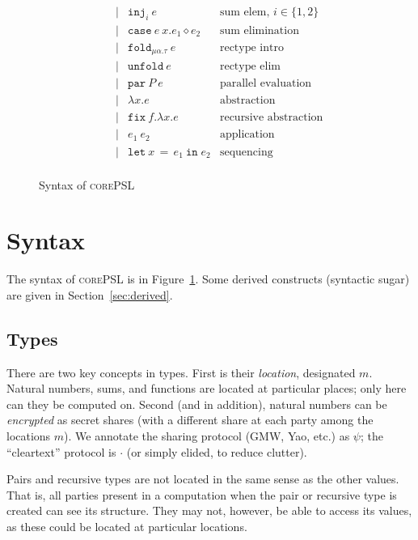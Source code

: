 \documentclass[10pt]{article}
\newcommand{\kw}[1]{\ensuremath{\mathtt{#1}}}
\newcommand{\trec}[2]{\ensuremath{\mu {#1}.{#2}}}
\newcommand{\elet}[3]{\ensuremath{\kw{let}~#1\, =\, #2~\kw{in}\;{#3}}}
\newcommand{\epar}[2]{\ensuremath{\kw{par}~{#1}~{#2}}}
\newcommand{\econd}[3]{\ensuremath{\kw{case}~{#1}~x.{#2} \diamond {#3}}}
\newcommand{\einj}[2]{\ensuremath{\kw{inj}_{#1}~{#2}}}
\newcommand{\elam}[2]{\ensuremath{\lambda {#1}.{#2}}}
\newcommand{\eapp}[2]{\ensuremath{{#1}~{#2}}}
\newcommand{\efix}[3]{\ensuremath{\kw{fix}~{#1}.\elam{#2}{#3}}}
\newcommand{\efold}[2]{\ensuremath{\kw{fold}_{#1}~{#2}}}
\newcommand{\eunfold}[1]{\ensuremath{\kw{unfold}~{#1}}}
\newcommand{\lang}{\textsc{corePSL}\xspace}
\begin{document}
\begin{figure}[h]
\[\begin{array}{rlcll}
                       && \mid & \einj{i}{e} & \text{sum elem, }i \in \{1,2\}\\
                       && \mid & \econd{e}{e_1}{e_2}  & \text{sum elimination} \\
                       && \mid & \efold{\trec{\alpha}{\tau}}{e} & \text{rectype intro}\\
                       && \mid & \eunfold{e} & \text{rectype elim}\\
                       && \mid & \epar{P}{e} & \text{parallel evaluation}\\
                       && \mid & \elam{x}{e}  & \text{abstraction} \\
                       && \mid & \efix{f}{x}{e} & \text{recursive abstraction} \\
                       && \mid & \eapp{e_1}{e_2}  & \text{application} \\
                       && \mid & \elet{x}{e_1}{e_2}  & \text{sequencing} \\
  \end{array}
  \]
  \caption{Syntax of \lang}
  \label{fig:syntax}
\end{figure}

\newpage

\section{Syntax}
\label{sec:syntax}

The syntax of \lang is in Figure~\ref{fig:syntax}. Some derived
constructs (syntactic sugar) are given in Section~\ref{sec:derived}.

\subsection{Types}

There are two key concepts in types. First is their \emph{location},
designated $m$. Natural numbers, sums, and functions are located at
particular places; only here can they be computed on. Second (and in
addition), natural numbers can be \emph{encrypted} as secret
shares (with a different share at each party among the locations
$m$). We annotate the sharing protocol (GMW, Yao, etc.) as $\psi$; the
``cleartext'' protocol is $\cdot$ (or simply elided, to reduce
clutter).

Pairs and recursive types are not located in the same sense as the
other values. That is, all parties present in a computation when the
pair or recursive type is created can see its structure. They may not, however,
be able to access its values, as these could be located at particular
locations.
\end{document}
